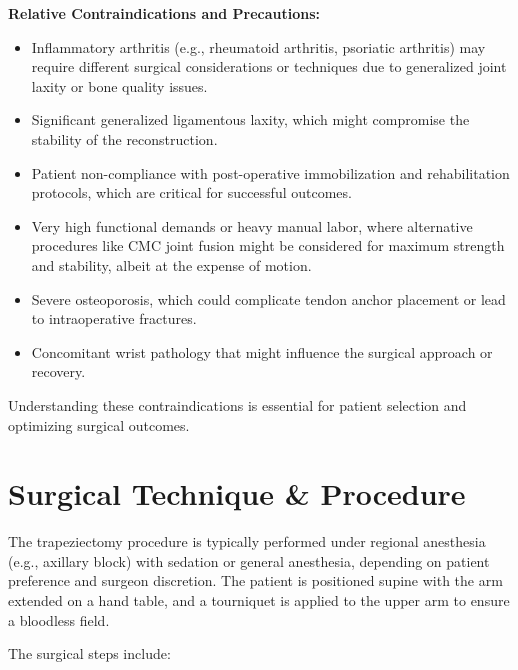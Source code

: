 \textbf{Relative Contraindications and Precautions:}
\begin{itemize}
  \item Inflammatory arthritis (e.g., rheumatoid arthritis, psoriatic arthritis) may require different surgical considerations or techniques due to generalized joint laxity or bone quality issues.
  \item Significant generalized ligamentous laxity, which might compromise the stability of the reconstruction.
  \item Patient non-compliance with post-operative immobilization and rehabilitation protocols, which are critical for successful outcomes.
  \item Very high functional demands or heavy manual labor, where alternative procedures like CMC joint fusion might be considered for maximum strength and stability, albeit at the expense of motion.
  \item Severe osteoporosis, which could complicate tendon anchor placement or lead to intraoperative fractures.
  \item Concomitant wrist pathology that might influence the surgical approach or recovery.
\end{itemize}

Understanding these contraindications is essential for patient selection and optimizing surgical outcomes.

\section*{Surgical Technique \& Procedure}
The trapeziectomy procedure is typically performed under regional anesthesia (e.g., axillary block) with sedation or general anesthesia, depending on patient preference and surgeon discretion. The patient is positioned supine with the arm extended on a hand table, and a tourniquet is applied to the upper arm to ensure a bloodless field.

The surgical steps include:

